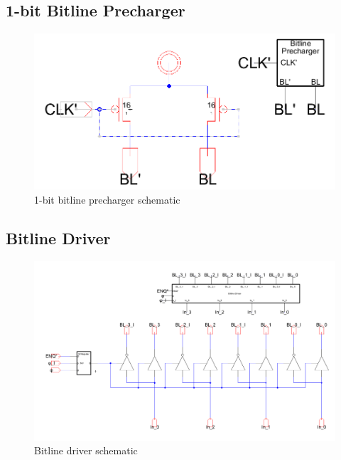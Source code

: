 \documentclass[12pt]{report}
\begin{document}
\subsection*{1-bit Bitline Precharger}
\begin{figure}[H]
  \centering
    \includegraphics[width=1.0\textwidth]{Schematics/precharge_schematic.PNG}
  \caption{1-bit bitline precharger schematic}
  \label{fig:precharge}
\end{figure}

\subsection*{Bitline Driver}
\begin{figure}[H]
  \centering
    \includegraphics[width=1.0\textwidth]{Schematics/bitline_driver_schematic.PNG}
  \caption{Bitline driver schematic}
  \label{fig:bitline_driver_schematic}
\end{figure}
\end{document}
